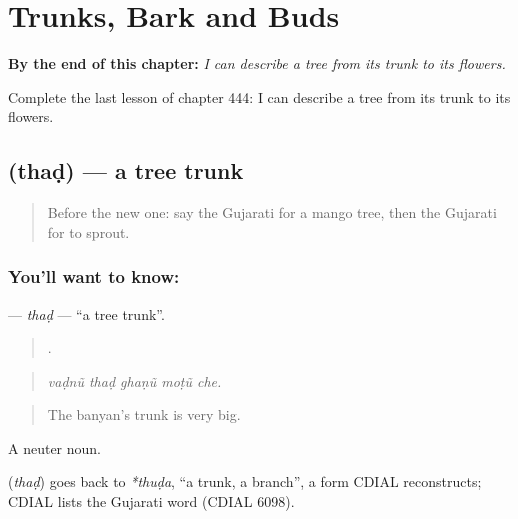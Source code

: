 
\chapter{Trunks, Bark and Buds}
\label{ch:gu-trunks-bark-and-buds}

\begin{chapteropening}
\textbf{By the end of this chapter:} \emph{I can describe a tree from its trunk to its flowers.}

Complete the last lesson of chapter 444: I can describe a tree from its trunk to its flowers.
\end{chapteropening}

\section[\texorpdfstring{\gu{થડ} (thaḍ)}{થડ (thaḍ)}]{ (thaḍ) — a tree trunk}

\label{lesson:GU-C444-thad}



\begin{quote}
Before the new one: say the Gujarati for a mango tree, then the Gujarati for to sprout.
\end{quote}

\subsection*{You'll want to know: }
\textbf{} — \emph{thaḍ} — \textquotedblleft{}a tree trunk\textquotedblright{}.

\begin{quote}
    .
\end{quote}

\begin{quote}
\emph{vaḍnũ thaḍ ghaṇũ moṭũ che.}
\end{quote}

\begin{quote}
The banyan's trunk is very big.
\end{quote}

A neuter noun.

\begin{cousinweb}
\textbf{} (\emph{thaḍ}) goes back to \emph{*thuḍa}, \textquotedblleft{}a trunk, a branch\textquotedblright{}, a form CDIAL reconstructs; CDIAL lists the Gujarati word (CDIAL 6098).
\end{cousinweb}

